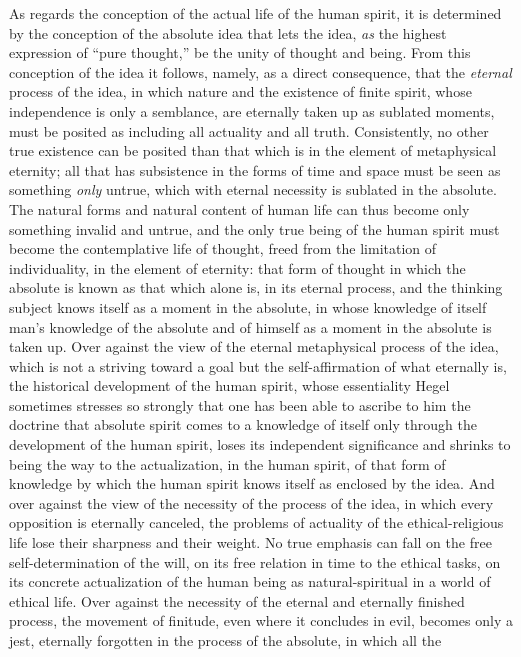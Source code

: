 As regards the conception of the actual life of the human spirit, it is
determined by the conception of the absolute idea that lets the idea,
\emph{as} the highest expression of ``pure thought,'' be the unity of
thought and being. From this conception of the idea it follows, namely,
as a direct consequence, that the \emph{eternal} process of the idea, in
which nature and the existence of finite spirit, whose independence is
only a semblance, are eternally taken up as sublated moments, must be
posited as including all actuality and all truth. Consistently, no
other true existence can be posited than that which is in the element
of metaphysical eternity; all that has subsistence in the forms of time
and space must be seen as something \emph{only} untrue, which with
eternal necessity is sublated in the absolute. The natural forms and
natural content of human life can thus become only something invalid
and untrue, and the only true being of the human spirit must become the
contemplative life of thought, freed from the limitation of
individuality, in the element of eternity: that form of thought in
which the absolute is known as that which alone is, in its eternal
process, and the thinking subject knows itself as a moment in the
absolute, in whose knowledge of itself man's knowledge of the absolute
and of himself as a moment in the absolute is taken up.
Over against the view of the eternal metaphysical process of
the idea, which is not a striving toward a goal but the
self-affirmation of what eternally is, the historical development of
the human spirit, whose essentiality Hegel sometimes stresses so
strongly that one has been able to ascribe to him the doctrine that
absolute spirit comes to a knowledge of itself only through the
development of the human spirit, loses its independent significance and
shrinks to being the way to the actualization, in the human spirit, of
that form of knowledge by which the human spirit knows itself as
enclosed by the idea. And over against the view of the necessity of the
process of the idea, in which every opposition is eternally canceled,
the problems of actuality of the ethical-religious life lose their
sharpness and their weight. No true emphasis can fall on the free
self-determination of the will, on its free relation in time to the
ethical tasks, on its concrete actualization of the human being as
natural-spiritual in a world of ethical life. Over against the
necessity of the eternal and eternally finished process, the movement
of finitude, even where it concludes in evil, becomes only a jest,
eternally forgotten in the process of the absolute, in which all the
